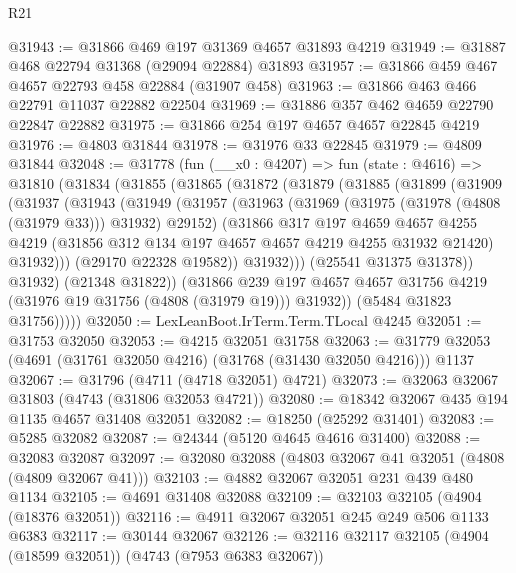 \begin{lexlean}{R21}
\begin{coremodule}
@31943 := @31866 @469 @197 @31369 @4657 @31893 @4219
@31949 := @31887 @468 @22794 @31368 (@29094 @22884) @31893
@31957 := @31866 @459 @467 @4657 @22793 @458 @22884 (@31907 @458)
@31963 := @31866 @463 @466 @22791 @11037 @22882 @22504
@31969 := @31886 @357 @462 @4659 @22790 @22847 @22882
@31975 := @31866 @254 @197 @4657 @4657 @22845 @4219
@31976 := @4803 @31844
@31978 := @31976 @33 @22845
@31979 := @4809 @31844
@32048 := @31778
    (fun (__x0 : @4207) =>
    fun (state : @4616) =>
    @31810
      (@31834
        (@31855
          (@31865
            (@31872
              (@31879
                (@31885
                  (@31899
                    (@31909
                      (@31937
                        (@31943
                          (@31949
                            (@31957
                              (@31963
                                (@31969 (@31975 (@31978 (@4808 (@31979 @33))) @31932) @29152)
                                (@31866
                                  @317
                                  @197
                                  @4659
                                  @4657
                                  @4255
                                  @4219
                                  (@31856 @312 @134 @197 @4657 @4657 @4219 @4255 @31932 @21420)
                                  @31932)))
                            (@29170 @22328 @19582))
                          @31932)))
                    (@25541 @31375 @31378))
                  @31932)
                (@21348 @31822))
              (@31866
                @239
                @197
                @4657
                @4657
                @31756
                @4219
                (@31976 @19 @31756 (@4808 (@31979 @19)))
                @31932))
            (@5484 @31823 @31756)))))
@32050 := LexLeanBoot.IrTerm.Term.TLocal @4245
@32051 := @31753 @32050
@32053 := @4215 @32051 @31758
@32063 := @31779 @32053 (@4691 (@31761 @32050 @4216) (@31768 (@31430 @32050 @4216))) @1137
@32067 := @31796 (@4711 (@4718 @32051) @4721)
@32073 := @32063 @32067 @31803 (@4743 (@31806 @32053 @4721))
@32080 := @18342 @32067 @435 @194 @1135 @4657 @31408 @32051
@32082 := @18250 (@25292 @31401)
@32083 := @5285 @32082
@32087 := @24344 (@5120 @4645 @4616 @31400)
@32088 := @32083 @32087
@32097 := @32080 @32088 (@4803 @32067 @41 @32051 (@4808 (@4809 @32067 @41)))
@32103 := @4882 @32067 @32051 @231 @439 @480 @1134
@32105 := @4691 @31408 @32088
@32109 := @32103 @32105 (@4904 (@18376 @32051))
@32116 := @4911 @32067 @32051 @245 @249 @506 @1133 @6383
@32117 := @30144 @32067
@32126 := @32116 @32117 @32105 (@4904 (@18599 @32051)) (@4743 (@7953 @6383 @32067))

\end{coremodule}
\end{lexlean}

